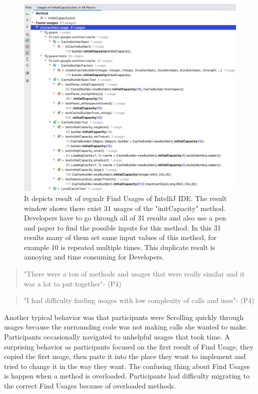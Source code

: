 \documentclass[conference]{IEEEtran}
\begin{document}
\begin{figure}
    \centering
    \includegraphics [width=\columnwidth,keepaspectratio, clip]{figures/challenge}
    \caption{It depicts result of regualr Find Usages of IntelliJ IDE. The result window shows there exist 31 usages of the "initCapacity" method. Developers have to go through all of 31 results and also use a pen and paper to find the possible inputs for this method. In this 31 results many of them set same input values of this method, for example 10 is repeated multiple times. This duplicate result is annoying and time consuming for Developers. 
}
\label{fig:usege}
\end{figure}

\begin{quote}"There were a ton of methods and usages that were really similar and it was a lot to put together"- (P4)\end{quote}
\begin{quote}"I had difficulty finding usages with low complexity of calls and uses"- (P4)\end{quote}

Another typical behavior was that participants were Scrolling quickly through usages because the surrounding code was not making calls she wanted to make. Participants occasionally navigated to unhelpful usages that took time. A surprising behavior as participants focused on the first result of Find Usage, they copied the first usage, then paste it into the place they want to implement and tried to change it in the way they want. The confusing thing about Find Usages is happen when a method is overloaded. Participants had difficulty migrating to the correct Find Usages because of overloaded methods.
\end{document}

